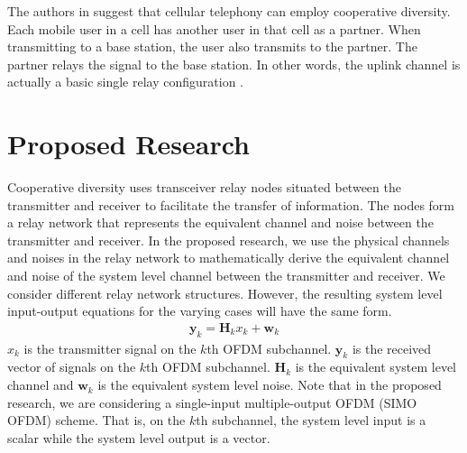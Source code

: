 \documentclass[12]{article}
\begin{document}
The authors in \cite{mybib:confer_0001} suggest that cellular telephony can employ cooperative diversity.  Each mobile user in a cell has another user in that cell as a partner.  When transmitting to a base station, the user also transmits to the partner.  The partner relays the signal to the base station.  In other words, the uplink channel is actually a basic single relay configuration \cite{mybib:book_0002}.

\section{Proposed Research}
Cooperative diversity uses transceiver relay nodes situated between the transmitter and receiver to facilitate the transfer of information.  The nodes form a relay network that represents the equivalent channel and noise between the transmitter and receiver.  In the proposed research, we use the physical channels and noises in the relay network to mathematically derive the equivalent channel and noise of the system level channel between the transmitter and receiver.  We consider different relay network structures.  However, the resulting system level input-output equations for the varying cases will have the same form.
\begin{eqnarray}
\mathbf y_k = \mathbf H_k x_k + \mathbf w_k
\end{eqnarray}
$x_k$ is the transmitter signal on the $k$th OFDM subchannel.  $\mathbf y_k$ is the received vector of signals on the $k$th OFDM subchannel.  $\mathbf H_k$ is the equivalent system level channel and $\mathbf w_k$ is the equivalent system level noise.  Note that in the proposed research, we are considering a single-input multiple-output OFDM (SIMO OFDM) scheme.  That is, on the $k$th subchannel, the system level input is a scalar while the system level output is a vector.
\end{document}
